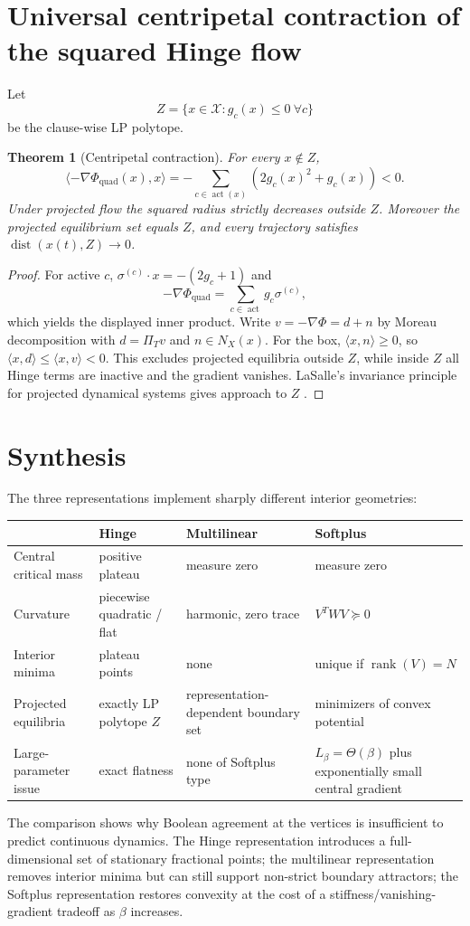 \documentclass[11pt,a4paper]{article}
\newtheorem{theorem}{Theorem}[section]
\begin{document}
\section{Universal centripetal contraction of the squared Hinge flow}
Let
\[
Z=\{x\in\mathcal X:g_c(x)\le0\ \forall c\}
\]
be the clause-wise LP polytope.
\begin{theorem}[Centripetal contraction]
For every $x\notin Z$,
\[
\langle-\nabla\Phi_{\mathrm{quad}}(x),x\rangle=-\sum_{c\in\operatorname{act}(x)}(2g_c(x)^2+g_c(x))<0.
\]
Under projected flow the squared radius strictly decreases outside $Z$. Moreover the projected equilibrium set equals $Z$, and every trajectory satisfies $\operatorname{dist}(x(t),Z)\to0$.
\end{theorem}
\begin{proof}
For active $c$, $\sigma^{(c)}\cdot x=-(2g_c+1)$ and
\[
-\nabla\Phi_{\mathrm{quad}}=\sum_{c\in\operatorname{act}}g_c\sigma^{(c)},
\]
which yields the displayed inner product. Write $v=-\nabla\Phi=d+n$ by Moreau decomposition with $d=\Pi_Tv$ and $n\in N_X(x)$. For the box, $\langle x,n\rangle\ge0$, so $\langle x,d\rangle\le\langle x,v\rangle<0$. This excludes projected equilibria outside $Z$, while inside $Z$ all Hinge terms are inactive and the gradient vanishes. LaSalle's invariance principle for projected dynamical systems gives approach to $Z$ \cite{brogliato2006equivalence,nagurney1996projected}.
\end{proof}
\section{Synthesis}
The three representations implement sharply different interior geometries:
\begin{center}\small
\begin{tabularx}{\textwidth}{@{}lXXX@{}}
\toprule
& Hinge & Multilinear & Softplus\\\midrule
Central critical mass & positive plateau & measure zero & measure zero\\
Curvature & piecewise quadratic / flat & harmonic, zero trace & $V^TWV\succeq0$\\
Interior minima & plateau points & none & unique if $\operatorname{rank}(V)=N$\\
Projected equilibria & exactly LP polytope $Z$ & representation-dependent boundary set & minimizers of convex potential\\
Large-parameter issue & exact flatness & none of Softplus type & $L_\beta=\Theta(\beta)$ plus exponentially small central gradient\\
\bottomrule
\end{tabularx}
\end{center}
The comparison shows why Boolean agreement at the vertices is insufficient to predict continuous dynamics. The Hinge representation introduces a full-dimensional set of stationary fractional points; the multilinear representation removes interior minima but can still support non-strict boundary attractors; the Softplus representation restores convexity at the cost of a stiffness/vanishing-gradient tradeoff as $\beta$ increases.
\end{document}
